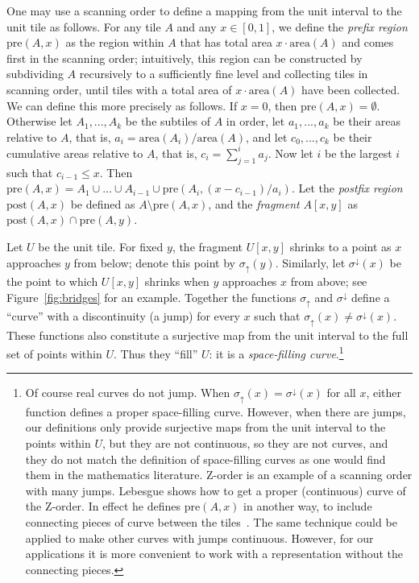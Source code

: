 \documentclass[11pt,a4paper]{article}
\newcommand{\area}{\mathrm{area}}
\newcommand{\unittile}{\ensuremath{U}\xspace}
\newcommand{\prefix}{\mathrm{pre}}
\newcommand{\postfix}{\mathrm{post}}
\begin{document}
One may use a scanning order to define a mapping from the unit interval to the unit tile as follows. For any tile $A$ and any $x \in [0,1]$, we define the \emph{prefix region} $\prefix(A,x)$ as the region within $A$ that has total area $x \cdot \area(A)$ and comes first in the scanning order; intuitively, this region can be constructed by subdividing $A$ recursively to a sufficiently fine level and collecting tiles in scanning order, until tiles with a total area of $x \cdot \area(A)$ have been collected. We can define this more precisely as follows. If $x = 0$, then $\prefix(A,x) = \emptyset$. Otherwise let $A_1,...,A_k$ be the subtiles of $A$ in order, let $a_1,...,a_k$ be their areas relative to $A$, that is, $a_i = \area(A_i)/\area(A)$, and let $c_0,...,c_k$ be their cumulative areas relative to $A$, that is, $c_i = \sum_{j=1}^i a_j$. Now let $i$ be the largest $i$ such that $c_{i-1} \leq x$. Then $\prefix(A,x) = A_1 \cup ... \cup A_{i-1} \cup \prefix(A_i,(x-c_{i-1})/a_i)$. Let the \emph{postfix region} $\postfix(A,x)$ be defined as $A \setminus \prefix(A,x)$, and the \emph{fragment} $A[x,y]$ as $\postfix(A,x) \cap \prefix(A,y)$.

Let \unittile be the unit tile. For fixed $y$, the fragment $\unittile[x,y]$ shrinks to a point as $x$ approaches $y$ from below; denote this point by $\sigma_{\uparrow}(y)$. Similarly, let $\sigma^{\downarrow}(x)$ be the point to which $\unittile[x,y]$ shrinks when $y$ approaches $x$ from above; see Figure~\ref{fig:bridges} for an example. Together the functions $\sigma_{\uparrow}$ and $\sigma^{\downarrow}$ define a ``curve'' with a discontinuity (a jump) for every $x$ such that $\sigma_{\uparrow}(x) \neq \sigma^{\downarrow}(x)$. These functions also constitute a surjective map from the unit interval to the full set of points within \unittile. Thus they ``fill'' \unittile: it is a \emph{space-filling curve}.\footnote{Of course real curves do not jump. When $\sigma_{\uparrow}(x) = \sigma^{\downarrow}(x)$ for all $x$, either function defines a proper space-filling curve. However, when there are jumps, our definitions only provide surjective maps from the unit interval to the points within \unittile, but they are not continuous, so they are not curves, and they do not match the definition of space-filling curves as one would find them in the mathematics literature. Z-order is an example of a scanning order with many jumps. Lebesgue shows how to get a proper (continuous) curve of the Z-order. In effect he defines $\prefix(A,x)$ in another way, to include connecting pieces of curve between the tiles~\cite{Lebesgue1904}. The same technique could be applied to make other curves with jumps continuous. However, for our applications it is more convenient to work with a representation without the connecting pieces.}
\end{document}
